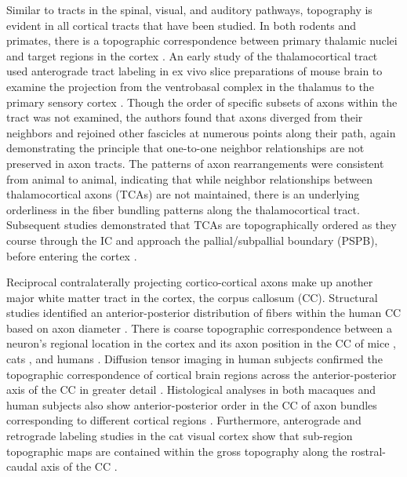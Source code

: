 Similar to tracts in the spinal, visual, and auditory pathways, topography is evident in all cortical tracts that have been studied. 
In both rodents and primates, there is a topographic correspondence between primary thalamic nuclei and target regions in the cortex \cite{caviness1980tangential,hohl1991topographical}. 
An early study of the thalamocortical tract used anterograde tract labeling in ex vivo slice preparations of mouse brain to examine the projection from the ventrobasal complex in the thalamus to the primary sensory cortex \cite{bernardo1987axonal}. 
Though the order of specific subsets of axons within the tract was not examined, the authors found that axons diverged from their neighbors and rejoined other fascicles at numerous points along their path, again demonstrating the principle that one-to-one neighbor relationships are not preserved in axon tracts.
The patterns of axon rearrangements were consistent from animal to animal, indicating that while neighbor relationships between thalamocortical axons (TCAs) are not maintained, there is an underlying orderliness in the fiber bundling patterns along the thalamocortical tract. 
Subsequent studies demonstrated that TCAs are topographically ordered as they course through the IC and approach the pallial/subpallial boundary (PSPB), before entering the cortex \cite{molnar1998mechanisms}.

Reciprocal contralaterally projecting cortico-cortical axons make up another major white matter tract in the cortex, the corpus callosum (CC). 
Structural studies identified an anterior-posterior distribution of fibers within the human CC based on axon diameter \cite{aboitiz1992fiber}.
There is coarse topographic correspondence between a neuron's regional location in the cortex and its axon position in the CC of mice \cite{ozaki1992prenatal}, cats \cite{nakamura1989topography}, and humans \cite{de1985topography}. 
Diffusion tensor imaging in human subjects confirmed the topographic correspondence of cortical brain regions across the anterior-posterior axis of the CC in greater detail \cite{hofer2006topography}. 
Histological analyses in both macaques and human subjects also show anterior-posterior order in the CC of axon bundles corresponding to different cortical regions \cite{caminiti2013diameter}.
Furthermore, anterograde and retrograde labeling studies in the cat visual cortex show that sub-region topographic maps are contained within the gross topography along the rostral-caudal axis of the CC \cite{payne1991visual}. 

